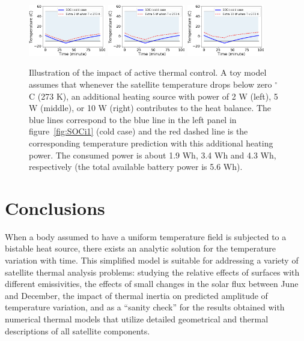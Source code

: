 \documentclass[]{aastex62}
\begin{document}
\begin{figure}[t!]
\centering
\includegraphics[width=0.3\textwidth, keepaspectratio]{figures/TempsPlotCompare_SOCi-cold-heated2.png} 
\includegraphics[width=0.3\textwidth, keepaspectratio]{figures/TempsPlotCompare_SOCi-cold-heated5.png} 
\includegraphics[width=0.3\textwidth, keepaspectratio]{figures/TempsPlotCompare_SOCi-cold-heated10.png} 
\caption{Illustration of the impact of active thermal control. A toy model assumes that whenever the satellite temperature
drops below zero $^\circ$C (273 K), an additional heating source with power of 2 W (left),  5 W (middle), or 10 W (right) contributes
to the heat balance. The blue lines correspond to the blue line in the left panel in figure~\ref{fig:SOCi1} (cold case) and the 
red dashed line is the corresponding temperature prediction with this additional heating power. The consumed power is about 
1.9 Wh, 3.4 Wh and 4.3 Wh, respectively (the total available battery power is 5.6 Wh). 
\label{fig:SOCi2}}
\end{figure}





\newpage
\section{Conclusions} 

When a body assumed to have a uniform temperature field is subjected to a bistable heat source,
there exists an analytic solution for the temperature variation with time. This simplified model is 
suitable for addressing a variety of satellite thermal analysis problems: studying the relative effects 
of surfaces with different emissivities, the effects of small changes in the solar flux between June 
and December, the impact of thermal inertia on predicted amplitude of temperature variation, and 
as a ``sanity check'' for the results obtained with numerical thermal models that utilize detailed 
geometrical and thermal descriptions of all satellite components. 
\end{document}
